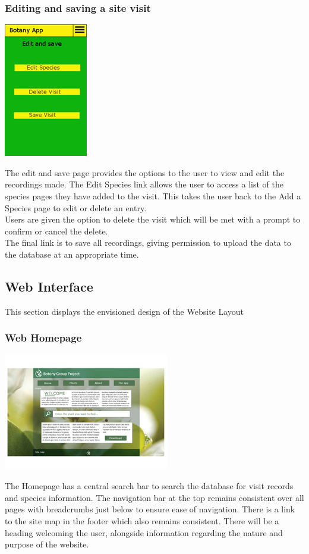 \documentclass[11pt, titlepage]{article}
\begin{document}
			\subsubsection{Editing and saving a site visit}
						\begin{center}
			\includegraphics[scale=1]{res/botanyAppEditSaveSiteVisit.png}
			\end{center}
			The edit and save page provides the options to the user to view and edit the recordings made. The Edit Species link allows the user to access a list of the species pages they have added to the visit. This takes the user back to the Add a Species page to edit or delete an entry.\\
			
Users are given the option to delete the visit which will be met with a prompt to confirm or cancel the delete.\\

 The final link is to save all recordings, giving permission to upload the data to the database at an appropriate time.\\
\clearpage
				
		\subsection{Web Interface}
		This section displays the envisioned design of the Website Layout
		
		\subsubsection{Web Homepage}
			\begin{center}
				\includegraphics[scale=1]{res/botanyWebHome.png}
			\end{center}
			The Homepage has a central search bar to search the database for visit records and species information. The navigation bar at the top remains consistent over all pages with breadcrumbs just below to ensure ease of navigation. There is a link to the site map in the footer which also remains consistent.
There will be a heading welcoming the user, alongside information regarding the nature and purpose of the website. 
\end{document}
